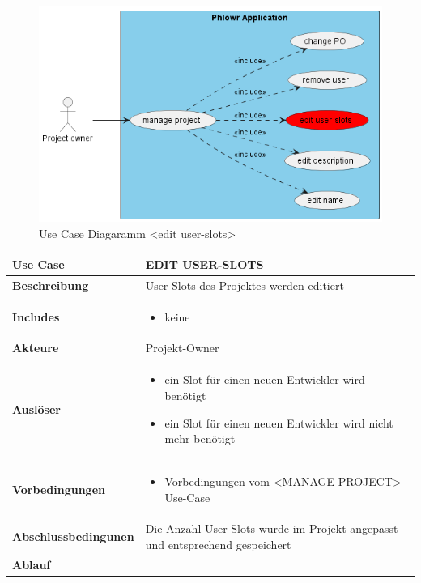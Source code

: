 
\begin{figure}[H]
    \begin{center}
      \includegraphics[width=0.3\linewidth]{../content/diagrams/usecase/manageProject/manageProjectUseCaseEditUserSlotsSelected.png}
      \caption{Use Case Diagaramm <edit user-slots> }
    \end{center}
  \end{figure}
  
\begin{table}[H]
    \centering
    \settowidth{}
    \setlength\extrarowheight{2pt}
    \begin{tabulary}{1.0\textwidth}{|m{4cm}|m{9cm}|}
      \hline
      \textbf{Use Case} &
      \textbf{EDIT USER-SLOTS}\\
      \hline
      \textbf{Beschreibung} &
      User-Slots des Projektes werden editiert\\ 
      \hline
      \textbf{Includes} &
      \begin{itemize}
       \item keine
        \end{itemize}\\  
      \hline
      \textbf{Akteure} &
      Projekt-Owner\\ 
      \hline
      \textbf{Auslöser} &
      \begin{itemize}
        \item ein Slot für einen neuen Entwickler wird benötigt
        \item ein Slot für einen neuen Entwickler wird nicht mehr benötigt
         \end{itemize}\\  
      \hline
      \textbf{Vorbedingungen} &
      \begin{itemize}
        \item Vorbedingungen vom <MANAGE PROJECT>-Use-Case
      \end{itemize}\\  
      \hline
      \textbf{Abschlussbedingunen} &
      Die Anzahl User-Slots wurde im Projekt angepasst und entsprechend gespeichert\\ 
      \hline
      \textbf{Ablauf} &
      \begin{enumerate}

\end{enumerate}
\end{tabulary}
\end{table}
